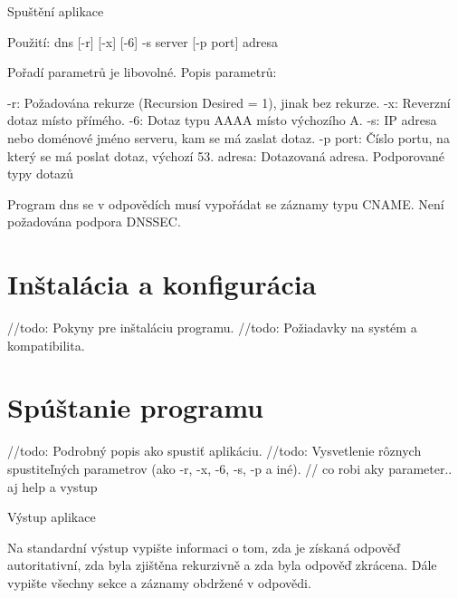 \documentclass[a4paper, 11pt]{article}
\begin{document}
	Spuštění aplikace

	Použití: dns [-r] [-x] [-6] -s server [-p port] adresa



	Pořadí parametrů je libovolné. Popis parametrů:

	-r: Požadována rekurze (Recursion Desired = 1), jinak bez rekurze.
	-x: Reverzní dotaz místo přímého.
	-6: Dotaz typu AAAA místo výchozího A.
	-s: IP adresa nebo doménové jméno serveru, kam se má zaslat dotaz.
	-p port: Číslo portu, na který se má poslat dotaz, výchozí 53.
	adresa: Dotazovaná adresa.
	Podporované typy dotazů



	Program dns se v odpovědích musí vypořádat se záznamy typu CNAME. Není požadována podpora DNSSEC.





	\section{Inštalácia a konfigurácia}
	//todo: Pokyny pre inštaláciu programu.
	//todo: Požiadavky na systém a kompatibilita.
	
	\section{Spúštanie programu}
	//todo: Podrobný popis ako spustiť aplikáciu.
	//todo: Vysvetlenie rôznych spustiteľných parametrov (ako -r, -x, -6, -s, -p a iné).
	// co robi aky parameter.. aj help a vystup

	
	Výstup aplikace



	Na standardní výstup vypište informaci o tom, zda je získaná odpověď autoritativní, zda byla zjištěna rekurzivně a zda byla odpověď zkrácena. Dále vypište všechny sekce a záznamy obdržené v odpovědi.
\end{document}
